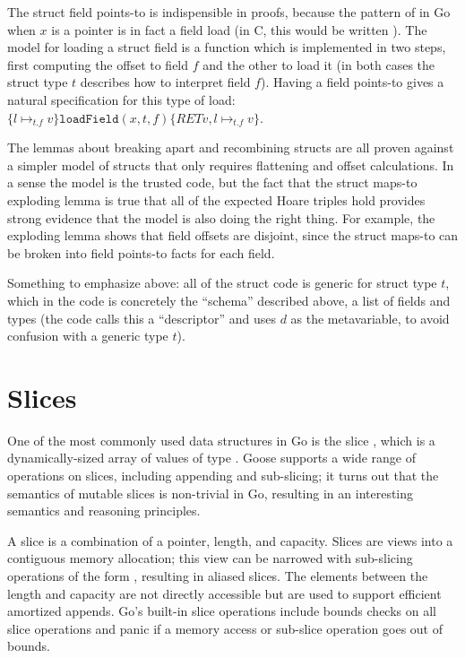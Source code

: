 The struct field points-to is indispensible in proofs, because the
pattern of  in Go when $x$ is a pointer is in fact a field
load (in C, this would be written ). The model
for loading a struct field is a function 
which is implemented in two steps, first computing the offset to field
$f$ and the other to load it (in both cases the struct type $t$
describes how to interpret field $f$). Having a field points-to gives
a natural specification for this type of load:
$\{ l \mapsto_{t.f} v \} \mathtt{loadField}(x, t, f) \{ RET v, l \mapsto_{t.f} v\}$.

The lemmas about breaking apart and recombining structs are all proven
against a simpler model of structs that only requires flattening and
offset calculations. In a sense the model is the trusted code, but the
fact that the struct maps-to exploding lemma is true that all of the
expected Hoare triples hold provides strong evidence that the model is
also doing the right thing. For example, the exploding lemma shows that
field offsets are disjoint, since the struct maps-to can be broken into
field points-to facts for each field.

Something to emphasize above: all of the struct code is generic for
struct type $t$, which in the code is concretely the ``schema''
described above, a list of fields and types (the code calls this a
``descriptor'' and uses $d$ as the metavariable, to avoid confusion
with a generic type $t$).

\section{Slices}

One of the most commonly used data structures in Go is the slice
, which is a dynamically-sized array of values of type
. Goose supports a wide range of operations on slices,
including appending and sub-slicing; it turns out that the semantics of
mutable slices is non-trivial in Go, resulting in an interesting
semantics and reasoning principles.

A slice is a combination of a pointer, length, and capacity. Slices are
views into a contiguous memory allocation; this view can be narrowed
with sub-slicing operations of the form , resulting
in aliased slices. The elements between the length and capacity are not
directly accessible but are used to support efficient amortized appends.
Go's built-in slice operations include bounds checks on all slice
operations and panic if a memory access or sub-slice operation goes out
of bounds.

